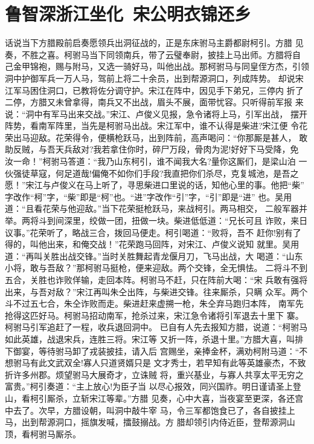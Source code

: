 \chapter{鲁智深浙江坐化~宋公明衣锦还乡}

话说当下方腊殿前启奏愿领兵出洞征战的，正是东床驸马主爵都尉柯引。方腊
见奏，不胜之喜。柯驸马当下同领南兵，带了云璧奉尉，披挂上马出师。方腊将自
己金甲锦袍，赐与附马，又选一骑好马，叫他出战。那柯驸马与同皇侄方杰，引领
洞中护御军兵一万人马，驾前上将二十余员，出到帮源洞口，列成阵势。
却说宋江军马困住洞口，已教将佐分调守护。宋江在阵中，因见手下弟兄，三停内
折了二停，方腊又未曾拿得，南兵又不出战，眉头不展，面带忧容。只听得前军报
来说：“洞中有军马出来交战。”宋江、卢俊义见报，急令诸将上马，引军出战，
摆开阵势，看南军阵里，当先是柯驸马出战。宋江军中，谁不认得是柴进?宋江便
令花荣出马迎敌。花荣得令，便横枪跃马，出到阵前，高声喝问：“你那厮是甚人，
敢助反贼，与吾天兵敌对?我若拿住你时，碎尸万段，骨肉为泥!好好下马受降，免
汝一命！”柯驸马答道：“我乃山东柯引，谁不闻我大名?量你这厮们，是梁山泊
一伙强徒草寇，何足道哉!偏俺不如你们手段?我直把你们杀尽，克复城池，是吾之
愿！”宋江与卢俊义在马上听了，寻思柴进口里说的话，知他心里的事。他把“柴”
字改作“柯”字，“柴”即是“柯”也。“进”字改作“引”字，“引”即是“进”
也。吴用道：“且看花荣与他迎敌。”当下花荣挺枪跃马，来战柯引。两马相交，
二般军器并举。两将斗到间深里，绞做一团，扭做一块。柴进低低道：“兄长可且
诈败，来日议事。”花荣听了，略战三合，拨回马便走。柯引喝道：“败将，吾不
赶你!别有了得的，叫他出来，和俺交战！”花荣跑马回阵，对宋江、卢俊义说知
就里。吴用道：“再叫关胜出战交锋。”当时关胜舞起青龙偃月刀，飞马出战，大
喝道：“山东小将，敢与吾敌？”那柯驸马挺枪，便来迎敌。两个交锋，全无惧怯。
二将斗不到五合，关胜也诈败佯输，走回本阵。柯驸马不赶，只在阵前大喝：“宋
兵敢有强将出来，与吾对敌？”宋江再叫朱仝出阵，与柴进交锋。往来厮杀，只瞒
众军。两个斗不过五七合，朱仝诈败而走。柴进赶来虚搠一枪，朱仝弃马跑归本阵，
南军先抢得这匹好马。柯驸马招动南军，抢杀过来，宋江急令诸将引军退去十里下
寨。柯驸马引军追赶了一程，收兵退回洞中。
已自有人先去报知方腊，说道：“柯驸马如此英雄，战退宋兵，连胜三将。宋江等
又折一阵，杀退十里。”方腊大喜，叫排下御宴，等待驸马卸了戎装披挂，请入后
宫赐坐，亲捧金杯，满劝柯附马道：“不想驸马有此文武双全!寡人只道贤婿只是
文才秀士，若早知有此等英雄豪杰，不致折许多州郡。烦望驸马大展奇才，立诛贼
将，重兴基业，与寡人共享太平无穷之富贵。”柯引奏道：“主上放心!为臣子当
以尽心报效，同兴国祚。明日谨请圣上登山，看柯引厮杀，立斩宋江等辈。”方腊
见奏，心中大喜，当夜宴至更深，各还宫中去了。次早，方腊设朝，叫洞中敲牛宰
马，令三军都饱食已了，各自披挂上马，出到帮源洞口，摇旗发喊，擂鼓搦战。方
腊却领引内侍近臣，登帮源洞山顶，看柯驸马厮杀。
